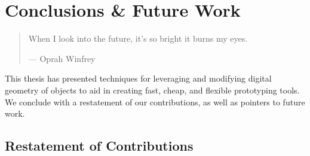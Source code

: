 \chapter{Conclusions \& Future Work}

\begin{quote}
When I look into the future, it's so bright it burns my eyes.

--- Oprah Winfrey
\end{quote}

This thesis has presented techniques for leveraging and modifying digital geometry of objects to aid in creating fast, cheap, and flexible prototyping tools. We conclude with a restatement of our contributions, as well as pointers to future work.

\section{Restatement of Contributions}

